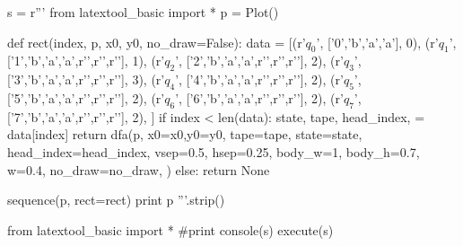 \newpage
\begin{python}
s = r'''
from latextool_basic import *
p = Plot()

def rect(index, p, x0, y0, no_draw=False):
    data = [(r'$q_0$',
             ['0','b','a','a'],
             0),
            (r'$q_1$',
             ['1','b','a','a',r'\SPACE',r'\SPACE',r'\SPACE'],
             1),
            (r'$q_2$',
             ['2','b','a','a',r'\SPACE',r'\SPACE',r'\SPACE'],
             2),
            (r'$q_3$',
             ['3','b','a','a',r'\SPACE',r'\SPACE',r'\SPACE'],
             3),
            (r'$q_4$',
             ['4','b','a','a',r'\SPACE',r'\SPACE',r'\SPACE'],
             2),
            (r'$q_5$',
             ['5','b','a','a',r'\SPACE',r'\SPACE',r'\SPACE'],
             2),
            (r'$q_6$',
             ['6','b','a','a',r'\SPACE',r'\SPACE',r'\SPACE'],
             2),
            (r'$q_7$',
             ['7','b','a','a',r'\SPACE',r'\SPACE',r'\SPACE'],
             2),
            ]
    if index < len(data):
        state, tape, head_index, = data[index]    
        return dfa(p,
               x0=x0,y0=y0,
               tape=tape,
               state=state,
               head_index=head_index,
               vsep=0.5, hsep=0.25,
               body_w=1, body_h=0.7, w=0.4,
               no_draw=no_draw,
               )
    else:
        return None

sequence(p, rect=rect)
print p
'''.strip()

from latextool_basic import *
#print console(s)
execute(s)
\end{python}


